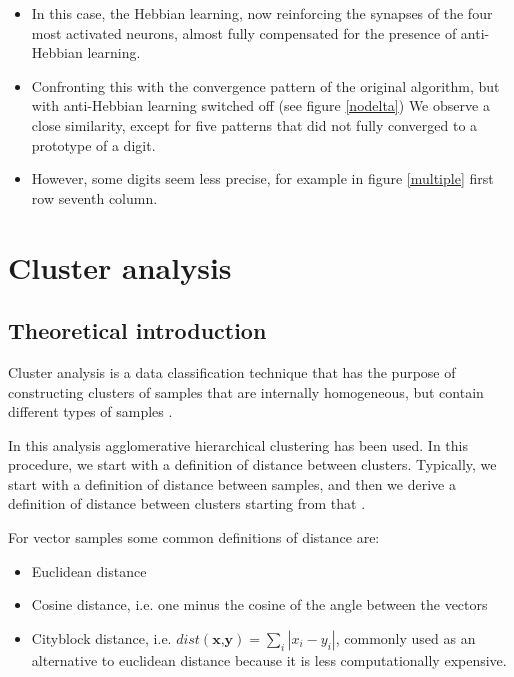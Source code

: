 \documentclass[a4paper]{report}
\begin{document}
\begin{itemize}
    \item In this case, the Hebbian learning, now reinforcing the synapses of the four most activated neurons, almost fully compensated for the presence of anti-Hebbian learning. 
    \item Confronting this with the convergence pattern of the original algorithm, but with anti-Hebbian learning switched off  (see figure \ref{nodelta}) We observe a close similarity, except for five patterns that did not fully converged to a prototype of a digit.
    \item However, some digits seem less precise, for example in figure \ref{multiple} first row seventh column.
\end{itemize}

\chapter{Cluster analysis}

\section{Theoretical introduction}

Cluster analysis is a data classification technique that has the purpose of constructing clusters of samples that are internally homogeneous, but contain different types of samples \cite{romesburg2004cluster}.

In this analysis agglomerative hierarchical clustering has been used.
In this procedure, we start with a definition of distance between clusters.
Typically, we start with a definition of distance between samples, and then we derive a definition of distance between clusters starting from that \cite{day1984efficient}.

For vector samples some common definitions of distance are:
\begin{itemize}
	\item Euclidean distance
	\item Cosine distance, i.e. one minus the cosine of the angle between the vectors
	\item Cityblock distance, i.e. $dist(\textbf{x,y}) = \sum_i |x_i-y_i|$, commonly used as an alternative to euclidean distance because it is less computationally expensive.
\end{itemize}
\end{document}
